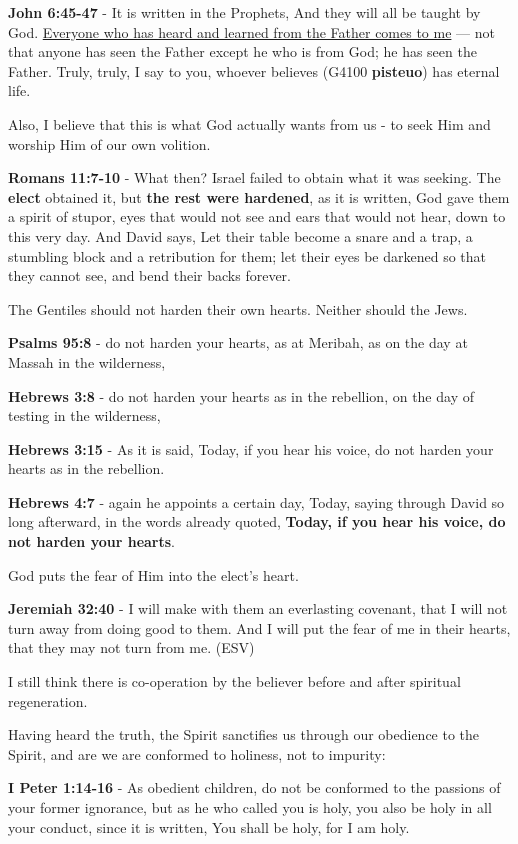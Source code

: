 \documentclass[11pt]{article}
\begin{document}
\textbf{John 6:45-47} - It is written in the Prophets, And they will all be taught by God. \uline{Everyone who has heard and learned from the Father comes to me} — not that anyone has seen the Father except he who is from God; he has seen the Father. Truly, truly, I say to you, whoever believes (G4100 \textbf{pisteuo}) has eternal life.

Also, I believe that this is what God actually wants from us - to seek Him and worship Him of our own volition.

\textbf{Romans 11:7-10} - What then? Israel failed to obtain what it was seeking. The \textbf{elect} obtained it, but \textbf{the rest were hardened}, as it is written, God gave them a spirit of stupor, eyes that would not see and ears that would not hear, down to this very day.  And David says, Let their table become a snare and a trap, a stumbling block and a retribution for them; let their eyes be darkened so that they cannot see, and bend their backs forever.

The Gentiles should not harden their own hearts. Neither should the Jews.

\textbf{Psalms 95:8} - do not harden your hearts, as at Meribah, as on the day at Massah in the wilderness,

\textbf{Hebrews 3:8} - do not harden your hearts as in the rebellion, on the day of testing in the wilderness,

\textbf{Hebrews 3:15} - As it is said, Today, if you hear his voice, do not harden your hearts as in the rebellion.

\textbf{Hebrews 4:7} - again he appoints a certain day, Today, saying through David so long afterward, in the words already quoted, \textbf{Today, if you hear his voice, do not harden your hearts}.

God puts the fear of Him into the elect's heart.

\textbf{Jeremiah 32:40} - I will make with them an everlasting covenant, that I will not turn away from doing good to them. And I will put the fear of me in their hearts, that they may not turn from me. (ESV)

I still think there is co-operation by the believer before and after spiritual regeneration.

Having heard the truth, the Spirit sanctifies us through our obedience to the Spirit, and are we are conformed to holiness, not to impurity:

\textbf{I Peter 1:14-16} - As obedient children, do not be conformed to the passions of your former ignorance, but as he who called you is holy, you also be holy in all your conduct, since it is written, You shall be holy, for I am holy.
\end{document}
